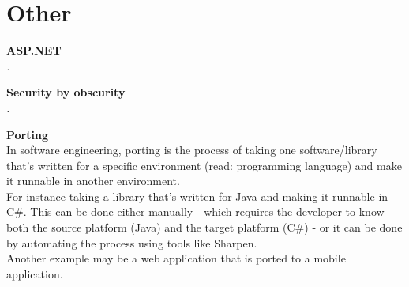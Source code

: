 \section{Other}

\textbf{ASP.NET} \\
\textit{.} 

\textbf{Security by obscurity} \\
\textit{.} 

\textbf{Porting} \\
In software engineering, porting is the process of taking one software/library that's written for a specific environment
(read: programming language) and make it runnable in another environment. \\
For instance taking a library that's written for Java and making it runnable in C\#. This can be done either manually - which requires the developer to know both the source platform (Java) and the target platform (C\#) - or it can be done by automating the process using tools like Sharpen. \\
Another example may be a web application that is ported to a mobile application.
